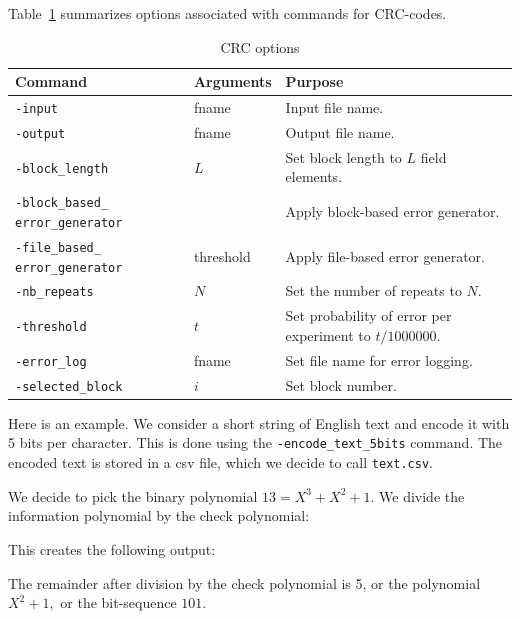 \bigskip

Table~\ref{tab:CRC:options} summarizes options associated with commands for CRC-codes. 
\begin{table}
	\begin{center}
	\begin{tabular}{|p{4cm}|p{3cm}|p{7cm}|}
		\hline
		Command & Arguments & Purpose \\
		\hline
		\hline
		\verb'-input' & fname & Input file name. \\
		\hline
		\verb'-output' & fname & Output file name. \\
		\hline
		\verb'-block_length' & $L$ & Set block length to $L$ field elements. \\
		\hline
		\verb'-block_based_' \verb'error_generator' &  & Apply block-based error generator. \\
		\hline
		\verb'-file_based_' \verb'error_generator' & threshold & Apply file-based error generator. \\
		\hline
		\verb'-nb_repeats' & $N$ & Set the number of repeats to $N$. \\
		\hline
		\verb'-threshold' & $t$ & Set probability of error per experiment to $t/1000000$. \\
		\hline
		\verb'-error_log' & fname & Set file name for error logging. \\
		\hline
		\verb'-selected_block' & $i$ & Set block number. \\
		\hline
		\end{tabular}
	\end{center}
	\caption{\label{tab:CRC:options}CRC options}
	\end{table}


\bigskip

Here is an example. 
We consider a short string of English text and encode it with 5 bits per character. 
This is done using the \verb'-encode_text_5bits' command. 
The encoded text is stored in a csv file, which we decide to call \verb'text.csv'.
{\tt

}
We decide to pick the binary polynomial $13 = X^3+X^2+1$.
We divide the information polynomial by the check polynomial: 
{\tt

}
This creates the following output:
\begin{mdframed}[style=MyFrame]
{\small

}
\end{mdframed}
The remainder after division by the check polynomial is 5, or 
the polynomial $X^2+1,$ or the bit-sequence $101.$ 


